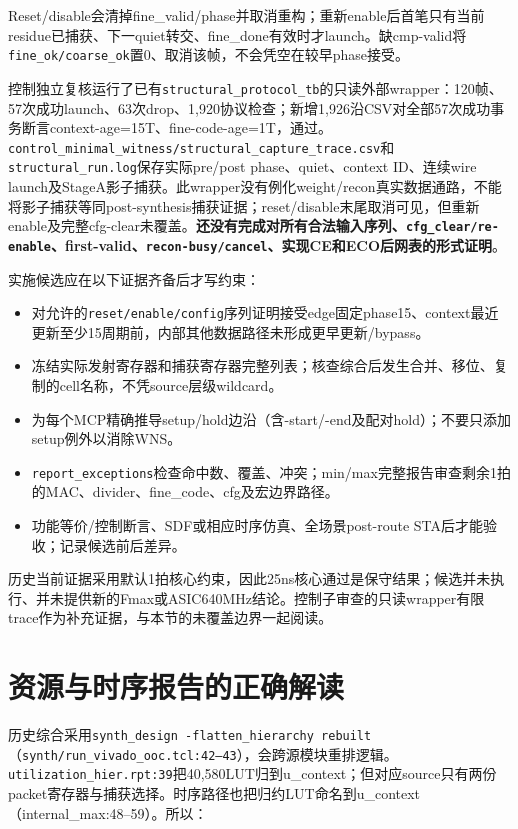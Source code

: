 \documentclass[UTF8,fontset=fandol,10pt,a4paper,openany]{ctexrep}
\newcommand{\code}[1]{\nolinkurl{#1}}
\begin{document}
Reset/disable会清掉fine\_valid/phase并取消重构；重新enable后首笔只有当前residue已捕获、下一quiet转交、fine\_done有效时才launch。缺cmp-valid将\code{fine_ok/coarse_ok}置0、取消该帧，不会凭空在较早phase接受。


控制独立复核运行了已有\code{structural_protocol_tb}的只读外部wrapper：120帧、57次成功launch、63次drop、1,920协议检查；新增1,926沿CSV对全部57次成功事务断言context-age=15T、fine-code-age=1T，通过。\code{control_minimal_witness/structural_capture_trace.csv}和\code{structural_run.log}保存实际pre/post phase、quiet、context ID、连续wire launch及StageA影子捕获。此wrapper没有例化weight/recon真实数据通路，不能将影子捕获等同post-synthesis捕获证据；reset/disable末尾取消可见，但重新enable及完整cfg-clear未覆盖。\textbf{还没有完成对所有合法输入序列、\code{cfg_clear/re-enable}、first-valid、\code{recon-busy/cancel}、实现CE和ECO后网表的形式证明}。


实施候选应在以下证据齐备后才写约束：


\begin{itemize}
\item 对允许的\code{reset/enable/config}序列证明接受edge固定phase15、context最近更新至少15周期前，内部其他数据路径未形成更早更新/bypass。
\item 冻结实际发射寄存器和捕获寄存器完整列表；核查综合后发生合并、移位、复制的cell名称，不凭source层级wildcard。
\item 为每个MCP精确推导setup/hold边沿（含-start/-end及配对hold）；不要只添加setup例外以消除WNS。
\item \code{report_exceptions}检查命中数、覆盖、冲突；min/max完整报告审查剩余1拍的MAC、divider、fine\_code、cfg及宏边界路径。
\item 功能等价/控制断言、SDF或相应时序仿真、全场景post-route STA后才能验收；记录候选前后差异。
\end{itemize}


历史当前证据采用默认1拍核心约束，因此25ns核心通过是保守结果；候选并未执行、并未提供新的Fmax或ASIC640MHz结论。控制子审查的只读wrapper有限trace作为补充证据，与本节的未覆盖边界一起阅读。


\section{资源与时序报告的正确解读}


历史综合采用\code{synth_design -flatten_hierarchy rebuilt}（\code{synth/run_vivado_ooc.tcl:42–43}），会跨源模块重排逻辑。\code{utilization_hier.rpt:39}把40,580LUT归到u\_context；但对应source只有两份packet寄存器与捕获选择。时序路径也把归约LUT命名到u\_context（internal\_max:48–59）。所以：
\end{document}
